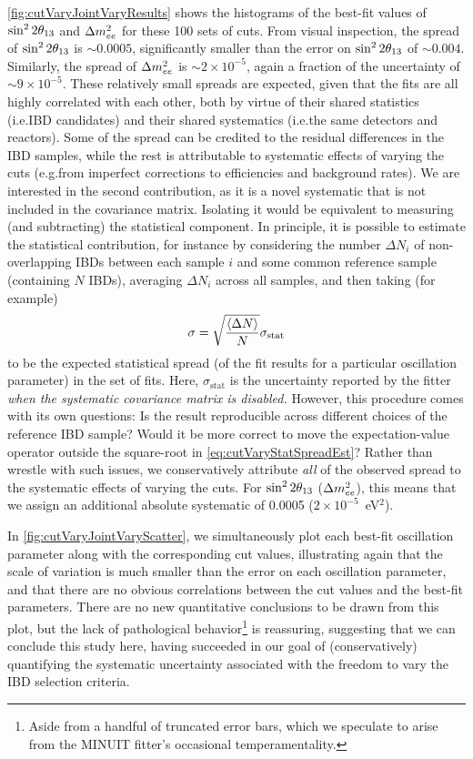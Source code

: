 \documentclass[../thesis.tex]{subfiles}
\begin{document}
\autoref{fig:cutVaryJointVaryResults} shows the histograms of the best-fit values of $\sin^2 2\theta_{13}$ and $\Delta m^2_{ee}$ for these 100 sets of cuts. From visual inspection, the spread of $\sin^2 2\theta_{13}$ is $\sim0.0005$, significantly smaller than the error on $\sin^2 2\theta_{13}$ of $\sim0.004$. Similarly, the spread of $\Delta m^2_{ee}$ is $\sim2\times10^{-5}$, again a fraction of the uncertainty of $\sim9\times10^{-5}$. These relatively small spreads are expected, given that the fits are all highly correlated with each other, both by virtue of their shared statistics (i.e.\@ IBD candidates) and their shared systematics (i.e.\@ the same detectors and reactors). Some of the spread can be credited to the residual differences in the IBD samples, while the rest is attributable to systematic effects of varying the cuts (e.g.\@ from imperfect corrections to efficiencies and background rates). We are interested in the second contribution, as it is a novel systematic that is not included in the covariance matrix. Isolating it would be equivalent to measuring (and subtracting) the statistical component. In principle, it is possible to estimate the statistical contribution, for instance by considering the number $\Delta N_i$ of non-overlapping IBDs between each sample $i$ and some common reference sample (containing $N$ IBDs), averaging $\Delta N_i$ across all samples, and then taking (for example)
\begin{equation}
  \label{eq:cutVaryStatSpreadEst}
  \sigma = \sqrt{\frac{\langle \Delta N \rangle}{N}} \sigma_{\mathrm{stat}}
\end{equation}
to be the expected statistical spread (of the fit results for a particular oscillation parameter) in the set of fits. Here, $\sigma_{\mathrm{stat}}$ is the uncertainty reported by the fitter \emph{when the systematic covariance matrix is disabled.} However, this procedure comes with its own questions: Is the result reproducible across different choices of the reference IBD sample? Would it be more correct to move the expectation-value operator outside the square-root in \autoref{eq:cutVaryStatSpreadEst}? Rather than wrestle with such issues, we conservatively attribute \emph{all} of the observed spread to the systematic effects of varying the cuts. For $\sin^2 2\theta_{13}$ ($\Delta m^2_{ee}$), this means that we assign an additional absolute systematic of 0.0005 ($2\times10^{-5}$~eV$^2$).

In \autoref{fig:cutVaryJointVaryScatter}, we simultaneously plot each best-fit oscillation parameter along with the corresponding cut values, illustrating again that the scale of variation is much smaller than the error on each oscillation parameter, and that there are no obvious correlations between the cut values and the best-fit parameters. There are no new quantitative conclusions to be drawn from this plot, but the lack of pathological behavior\footnote{Aside from a handful of truncated error bars, which we speculate to arise from the MINUIT fitter's occasional temperamentality.} is reassuring, suggesting that we can conclude this study here, having succeeded in our goal of (conservatively) quantifying the systematic uncertainty associated with the freedom to vary the IBD selection criteria.
\end{document}
